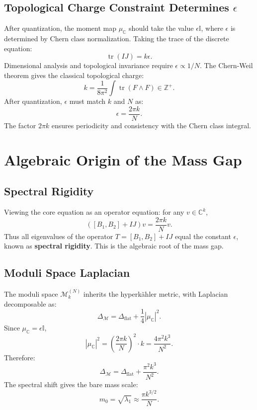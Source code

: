 \documentclass[12pt,a4paper]{amsart}
\theoremstyle{plain}
\theoremstyle{definition}
\theoremstyle{remark}
\DeclareMathOperator{\tr}{tr}
\begin{document}
\subsection{Topological Charge Constraint Determines $\epsilon$}

After quantization, the moment map $\mu_{\mathbb{C}}$ should take the value $\epsilon\mathbb{I}$, where $\epsilon$ is determined by Chern class normalization. Taking the trace of the discrete equation:
\begin{equation}
\tr(IJ) = k\epsilon.
\end{equation}
Dimensional analysis and topological invariance require $\epsilon\propto 1/N$. The Chern-Weil theorem gives the classical topological charge:
\begin{equation}
k = \frac{1}{8\pi^2}\int\tr(F\wedge F)\in\mathbb{Z}^+.
\end{equation}
After quantization, $\epsilon$ must match $k$ and $N$ as:
\begin{equation}\label{eq:epsilon}
\boxed{\epsilon = \frac{2\pi k}{N}.}
\end{equation}
The factor $2\pi k$ ensures periodicity and consistency with the Chern class integral.

\section{Algebraic Origin of the Mass Gap}

\subsection{Spectral Rigidity}

Viewing the core equation as an operator equation: for any $v\in\mathbb{C}^k$,
\begin{equation}
([B_1,B_2]+IJ)v = \frac{2\pi k}{N}v.
\end{equation}
Thus all eigenvalues of the operator $T=[B_1,B_2]+IJ$ equal the constant $\epsilon$, known as \textbf{spectral rigidity}. This is the algebraic root of the mass gap.

\subsection{Moduli Space Laplacian}

The moduli space $\mathcal{M}_k^{(N)}$ inherits the hyperk\"ahler metric, with Laplacian decomposable as:
\begin{equation}
\Delta_{\mathcal{M}} = \Delta_{\text{flat}} + \frac{1}{4}|\mu_{\mathbb{C}}|^2.
\end{equation}
Since $\mu_{\mathbb{C}}=\epsilon\mathbb{I}$,
\begin{equation}
|\mu_{\mathbb{C}}|^2 = \left(\frac{2\pi k}{N}\right)^2 \cdot k = \frac{4\pi^2 k^3}{N^2}.
\end{equation}
Therefore:
\begin{equation}
\Delta_{\mathcal{M}} = \Delta_{\text{flat}} + \frac{\pi^2 k^3}{N^2}.
\end{equation}
The spectral shift gives the bare mass scale:
\begin{equation}
m_0 = \sqrt{\lambda_1} \approx \frac{\pi k^{3/2}}{N}.
\end{equation}
\end{document}
